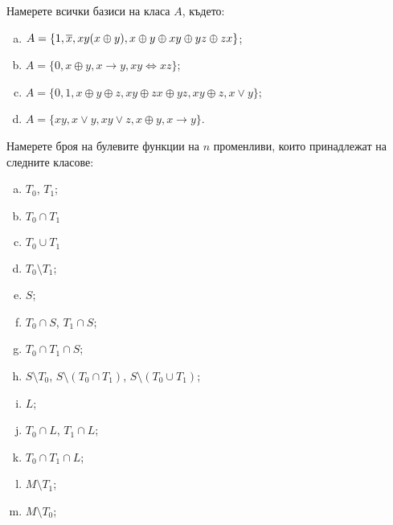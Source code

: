 \begin{problem}
  Намерете всички базиси на класа $A$, където:
  \begin{enumerate}[a)]
  \item 
    $A = \{1, \overline{x}, xy(x\oplus y), x \oplus y \oplus xy \oplus yz \oplus zx\}$;
  \item
    $A = \{0, x\oplus y, x \to y, xy \iff xz\}$;
  \item
    $A = \{0,1,x\oplus y \oplus z, xy \oplus zx \oplus yz, xy \oplus z, x \vee y\}$;
  \item
    $A = \{xy, x\vee y, xy\vee z, x\oplus y, x \to y\}$.
  \end{enumerate}
\end{problem}

\begin{problem}
  Намерете броя на булевите функции на $n$ променливи, които принадлежат на следните класове:
  \begin{enumerate}[a)]
  \item
    $T_0$, $T_1$;
  \item
    $T_0 \cap T_1$
  \item
    $T_0 \cup T_1$
  \item
    $T_0 \setminus T_1$;
  \item
    $S$;
  \item
    $T_0 \cap S$, $T_1 \cap S$;
  \item
    $T_0 \cap T_1 \cap S$;
  \item
    $S \setminus T_0$, $S \setminus (T_0 \cap T_1)$, $S \setminus (T_0 \cup T_1)$;
  \item
    $L$;
  \item
    $T_0 \cap L$, $T_1 \cap L$;
  \item
    $T_0 \cap T_1 \cap L$;
  \item
    $M \setminus T_1$;
  \item
    $M \setminus T_0$;
  \end{enumerate}
\end{problem}



